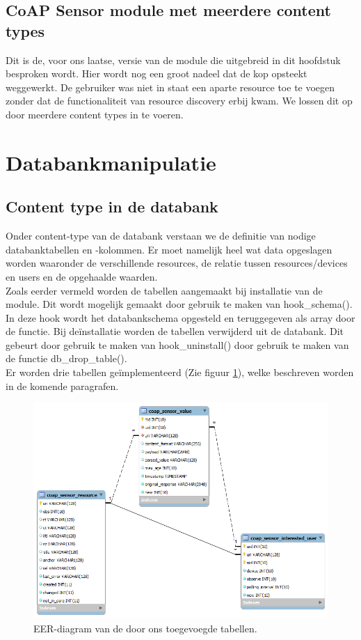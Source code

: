 \subsection{CoAP Sensor module met meerdere content types}
Dit is de, voor ons laatse, versie van de module die uitgebreid in dit hoofdstuk besproken wordt. Hier wordt nog een groot nadeel dat de kop opsteekt weggewerkt. De gebruiker was niet in staat een aparte resource toe te voegen zonder dat de functionaliteit van resource discovery erbij kwam. We lossen dit op door meerdere content types in te voeren.

\section{Databankmanipulatie}

\subsection{Content type in de databank}\label{databankSchema}
Onder content-type van de databank verstaan we de definitie van nodige databanktabellen en -kolommen. Er moet namelijk heel wat data opgeslagen worden waaronder de verschillende resources, de relatie tussen resources/devices en users en de opgehaalde waarden.\\

Zoals eerder vermeld worden de tabellen aangemaakt bij installatie van de module. Dit wordt mogelijk gemaakt door gebruik te maken van hook\_schema(). In deze hook wordt het databankschema opgesteld en teruggegeven als array door de functie. Bij de\"{i}nstallatie worden de tabellen verwijderd uit de databank. Dit gebeurt door gebruik te maken van hook\_uninstall() door gebruik te maken van de functie db\_drop\_table().\\

\noindent
Er worden drie tabellen ge\"{i}mplementeerd (Zie figuur \ref{fig:databankModel}), welke beschreven worden in de komende paragrafen.
\begin{figure}[h!]
\centering
\includegraphics[width=1\textwidth]{fig/databankModel}
\caption{EER-diagram van de door ons toegevoegde tabellen.}
\label{fig:databankModel}
\end{figure}

